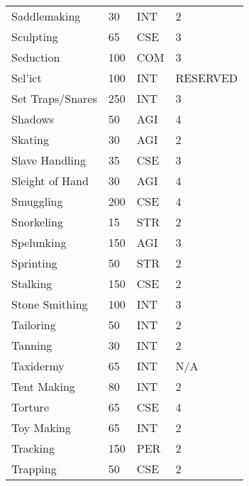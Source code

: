 \begin{normbox}
\begin{tabularx}{\linewidth}{@{} l X X X }
Saddlemaking & 30 & INT & 2 \\
Sculpting & 65 & CSE & 3 \\
Seduction & 100 & COM & 3 \\
Sel'ict & 100 & INT & RESERVED \\
Set Traps/Snares & 250 & INT & 3 \\
Shadows & 50 & AGI & 4 \\
Skating & 30 & AGI & 2 \\
Slave Handling & 35 & CSE & 3 \\
Sleight of Hand & 30 & AGI & 4 \\
Smuggling & 200 & CSE & 4 \\
Snorkeling & 15 & STR & 2 \\
Spelunking & 150 & AGI & 3 \\
Sprinting & 50 & STR & 2 \\
Stalking & 150 & CSE & 2 \\
Stone Smithing & 100 & INT & 3 \\
Tailoring & 50 & INT & 2 \\
Tanning & 30 & INT & 2 \\
Taxidermy & 65 & INT & N/A \\
Tent Making & 80 & INT & 2 \\
Torture & 65 & CSE & 4 \\
Toy Making & 65 & INT & 2 \\
Tracking & 150 & PER & 2 \\
Trapping & 50 & CSE & 2 \\
\end{tabularx}
\end{normbox}
